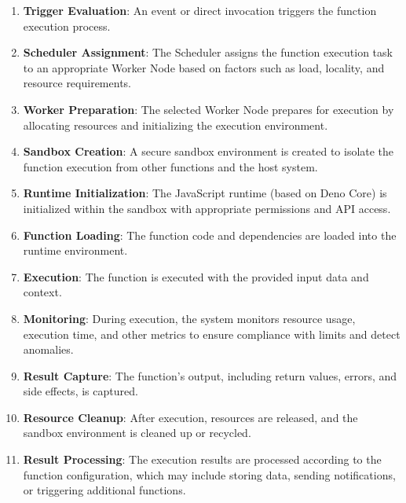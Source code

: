 \begin{enumerate}
    \item \textbf{Trigger Evaluation}: An event or direct invocation triggers the function execution process.
    
    \item \textbf{Scheduler Assignment}: The Scheduler assigns the function execution task to an appropriate Worker Node based on factors such as load, locality, and resource requirements.
    
    \item \textbf{Worker Preparation}: The selected Worker Node prepares for execution by allocating resources and initializing the execution environment.
    
    \item \textbf{Sandbox Creation}: A secure sandbox environment is created to isolate the function execution from other functions and the host system.
    
    \item \textbf{Runtime Initialization}: The JavaScript runtime (based on Deno Core) is initialized within the sandbox with appropriate permissions and API access.
    
    \item \textbf{Function Loading}: The function code and dependencies are loaded into the runtime environment.
    
    \item \textbf{Execution}: The function is executed with the provided input data and context.
    
    \item \textbf{Monitoring}: During execution, the system monitors resource usage, execution time, and other metrics to ensure compliance with limits and detect anomalies.
    
    \item \textbf{Result Capture}: The function's output, including return values, errors, and side effects, is captured.
    
    \item \textbf{Resource Cleanup}: After execution, resources are released, and the sandbox environment is cleaned up or recycled.
    
    \item \textbf{Result Processing}: The execution results are processed according to the function configuration, which may include storing data, sending notifications, or triggering additional functions.
\end{enumerate}

